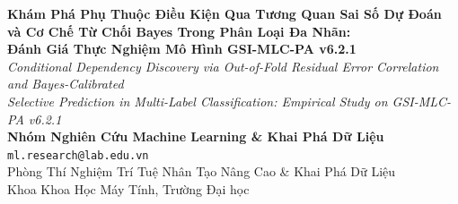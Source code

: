 \documentclass[10pt,a4paper,twoside]{article}
\begin{document}
\thispagestyle{firstpage}

\begin{center}
    {\LARGE\bfseries Khám Phá Phụ Thuộc Điều Kiện Qua Tương Quan Sai Số Dự Đoán\\ và Cơ Chế Từ Chối Bayes Trong Phân Loại Đa Nhãn:\\[0.3em] Đánh Giá Thực Nghiệm Mô Hình GSI-MLC-PA v6.2.1}\\[0.6em]
    {\large\textit{Conditional Dependency Discovery via Out-of-Fold Residual Error Correlation and Bayes-Calibrated\\ Selective Prediction in Multi-Label Classification: Empirical Study on GSI-MLC-PA v6.2.1}}\\[1.0em]
    {\textbf{Nhóm Nghiên Cứu Machine Learning \& Khai Phá Dữ Liệu}}\\[0.2em]
    {\texttt{ml.research@lab.edu.vn}}\\[0.2em]
    {\small Phòng Thí Nghiệm Trí Tuệ Nhân Tạo Nâng Cao \& Khai Phá Dữ Liệu}\\[0.1em]
    {\small Khoa Khoa Học Máy Tính, Trường Đại học}\\[1.0em]
\end{center}
\end{document}
